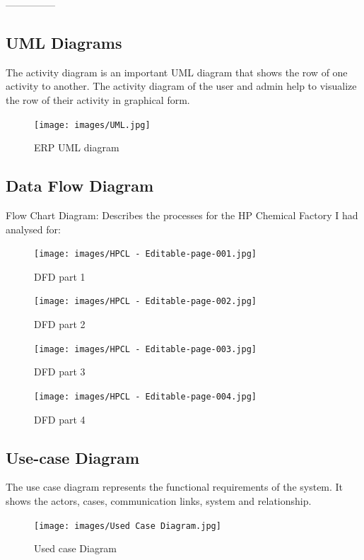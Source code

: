 ---------------
\subsection{UML Diagrams}
The activity diagram is an important UML diagram that shows the row of one activity to another. The activity diagram of the user and admin help to visualize the row of their activity in graphical form.

\begin{figure} [H]
    \centering
    \texttt{[image: images/UML.jpg]}
    \caption{ERP UML diagram}
    \label{fig:my_label}
\end{figure}

    



\subsection{Data Flow Diagram}Flow Chart Diagram: Describes the processes for the HP Chemical Factory I had analysed for: 


\begin{figure} [H]
    \hfill
    \texttt{[image: images/HPCL - Editable-page-001.jpg]}
    \caption{DFD part 1}
    \label{fig:my_label}
\end{figure}

\begin{figure} [H]
    \hfill
    \texttt{[image: images/HPCL - Editable-page-002.jpg]}
    \caption{DFD part 2}
    \label{fig:my_label}
\end{figure}   
\begin{figure} [H]
    \hfill
    \texttt{[image: images/HPCL - Editable-page-003.jpg]}
    \caption{DFD part 3}
    \label{fig:my_label}
\end{figure}
\begin{figure} [H]
    \hfill
    \texttt{[image: images/HPCL - Editable-page-004.jpg]}
    \caption{DFD part 4}
    \label{fig:my_label}
\end{figure}
\subsection{Use-case Diagram}
The use case diagram represents the functional requirements of the system. It shows the actors, cases, communication links, system and relationship.

\begin{figure} [H]
    \centering
    \texttt{[image: images/Used Case Diagram.jpg]}
    \caption{Used case Diagram}
    \label{fig:my_label}
\end{figure}
    
